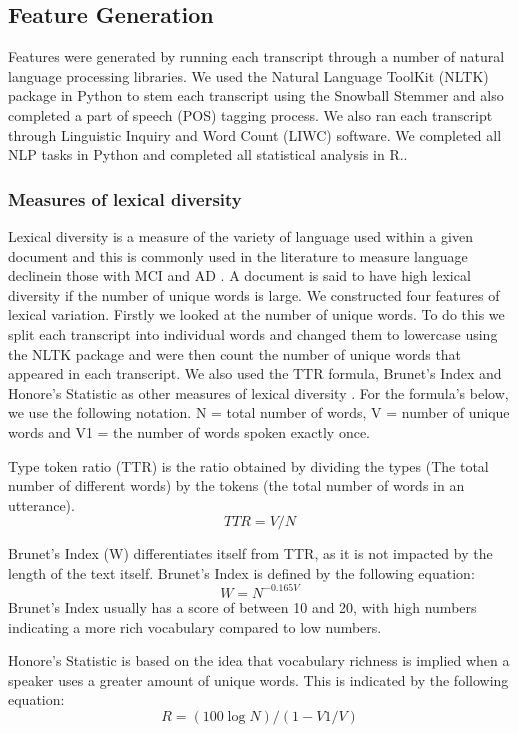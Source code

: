 \documentclass[12pt]{article}
\begin{document}
\subsection{Feature Generation}
Features were generated by running each transcript through a number of natural language processing libraries. We used the Natural Language ToolKit (NLTK) package \cite{Bird2009} in Python to stem each transcript using the Snowball Stemmer and also completed a part of speech (POS) tagging process. We also ran each transcript through Linguistic Inquiry and Word Count (LIWC) \cite{Pennebaker2015} software. We completed all NLP tasks in Python and completed all statistical analysis in R.. 
\par 
\subsubsection{Measures of lexical diversity}
Lexical diversity is a measure of the variety of language used within a given document and this is commonly used in the literature to measure language declinein those with MCI and AD \cite{Bucks2000, Le2012}. A document is said to have high lexical diversity if the number of unique words is large. We constructed four features of lexical variation. Firstly we looked at the number of unique words. To do this we split each transcript into individual words and changed them to lowercase using the NLTK package and were then count the number of unique words that appeared in each transcript. We also used the TTR formula, Brunet's Index and Honore's Statistic as other measures of lexical diversity \cite{Bucks2000}. For the formula's below, we use the following notation. N = total number of words, V = number of unique words and V1 = the number of words spoken exactly once.
\par 
Type token ratio (TTR) is the ratio obtained by dividing the types (The total number of different words) by the tokens (the total number of words in an utterance).
\begin{equation} \label{x1}
TTR = V / N
\end{equation}
\par 
Brunet's Index (W) differentiates itself from TTR, as it is not impacted by the length of the text itself. Brunet's Index is defined by the following equation:
\begin{equation} \label{x2}
W = N^{-0.165V}
\end{equation}
 Brunet's Index usually has a score of between 10 and 20, with high numbers indicating a more rich vocabulary compared to low numbers. \newline
\par 
Honore's Statistic is based on the idea that vocabulary richness is implied when a speaker uses a greater amount of unique words. This is indicated by the following equation: 
\begin{equation} \label{x3}
R = (100 \log N) / (1 - V1/V)
\end{equation}
\end{document}

